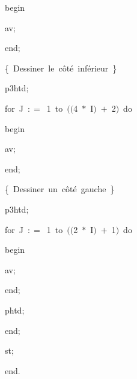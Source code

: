 {\vspace{\neglskip}\mbox{\blc  \blk\blk\blk\blk\idt  \mcl begin\idt }\par 
\vspace{\neglskip}\mbox{\blc  \blk\blk\blk\blk\blk\idt  av$;$}\par 
\vspace{\neglskip}\mbox{\blc  \blk\blk\blk\blk\idt  \mcl end\idt $;$}\par 
\vspace{\neglskip}\mbox{\blc  \blk\blk\blk\idt  \cmt  \{\ Dessiner\ le\ côté\ inférieur\ \}\idt }\par 
\vspace{\neglskip}\mbox{\blc  \blk\blk\blk\idt  p3htd$;$}\par 
\pagebreak[3] 
\vspace{\neglskip}\mbox{\blc  \blk\blk\blk\idt  \mcl for\idt \ J\ $:$$=$\ 1\ \mcl to\idt \ $($$($4\ $\ast$\ I$)$\ $+$\ 2$)$\ \mcl do\idt }\par 
\vspace{\neglskip}\mbox{\blc  \blk\blk\blk\blk\idt  \mcl begin\idt }\par 
\vspace{\neglskip}\mbox{\blc  \blk\blk\blk\blk\blk\idt  av$;$}\par 
\vspace{\neglskip}\mbox{\blc  \blk\blk\blk\blk\idt  \mcl end\idt $;$}\par 
\vspace{\neglskip}\mbox{\blc  \blk\blk\blk\idt  \cmt  \{\ Dessiner\ un\ côté\ gauche\ \}\idt }\par 
\vspace{\neglskip}\mbox{\blc  \blk\blk\blk\idt  p3htd$;$}\par 
\pagebreak[3] 
\vspace{\neglskip}\mbox{\blc  \blk\blk\blk\idt  \mcl for\idt \ J\ $:$$=$\ 1\ \mcl to\idt \ $($$($2\ $\ast$\ I$)$\ $+$\ 1$)$\ \mcl do\idt }\par 
\vspace{\neglskip}\mbox{\blc  \blk\blk\blk\blk\idt  \mcl begin\idt }\par 
\vspace{\neglskip}\mbox{\blc  \blk\blk\blk\blk\blk\idt  av$;$}\par 
\vspace{\neglskip}\mbox{\blc  \blk\blk\blk\blk\idt  \mcl end\idt $;$}\par 
\vspace{\neglskip}\mbox{\blc  \blk\blk\blk\idt  phtd$;$\ }\par 
\vspace{\neglskip}\mbox{\blc  \blk\blk\idt  \mcl end\idt $;$}\par 
\vspace{\neglskip}\mbox{\blc  \blk\idt  st$;$}\par 
\vspace{\neglskip}\mbox{\blc  \idt  \mcl end\idt $.$}\par 

\medskip }

